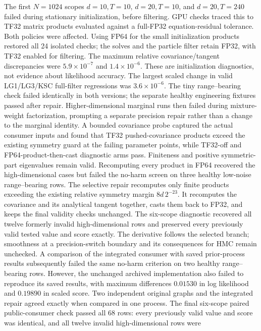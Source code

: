 \documentclass[11pt]{article}
\begin{document}
The first $N=1024$ scopes $d=10,T=10$, $d=20,T=10$, and
$d=20,T=240$ failed during stationary initialization, before filtering.
GPU checks traced this to TF32 matrix products evaluated against a
full-FP32 equation-residual tolerance. Both policies were affected.
Using FP64 for the small initialization products restored all 24 isolated
checks; the solves and the particle filter retain FP32, with TF32 enabled
for filtering. The maximum relative covariance/tangent discrepancies were
$5.9\times10^{-7}$ and $1.4\times10^{-6}$. These are initialization diagnostics,
not evidence about likelihood accuracy. The largest scaled change in valid
LG1/LG3/KSC full-filter regressions was $3.6\times10^{-6}$. The tiny
range--bearing check failed identically in both versions; the separate healthy
engineering fixtures passed after repair. Higher-dimensional marginal runs
then failed during mixture-weight factorization, prompting a separate
precision repair rather than a change to the marginal identity. A bounded covariance probe captured the actual
consumer inputs and found that TF32 pushed-covariance products exceed the
existing symmetry guard at the failing parameter points, while TF32-off and
FP64-product-then-cast diagnostic arms pass. Finiteness and positive
symmetric-part eigenvalues remain valid. Recomputing every product in FP64
recovered the high-dimensional cases but failed the no-harm screen on three
healthy low-noise range--bearing rows. The selective repair recomputes only
finite products exceeding the existing relative symmetry margin
$8d\,2^{-23}$. It recomputes the covariance and its analytical tangent
together, casts them back to FP32, and keeps the final validity checks
unchanged. The six-scope diagnostic recovered all twelve formerly invalid
high-dimensional rows and preserved every previously valid tested value and
score exactly. The derivative follows the selected branch; smoothness at a
precision-switch boundary and its consequences for HMC remain unchecked.
A comparison of the integrated consumer with saved prior-process results
subsequently failed the same no-harm criterion on two healthy range--bearing
rows. However, the unchanged archived implementation also failed to reproduce
its saved results, with maximum differences $0.01530$ in log likelihood and
$0.19890$ in scaled score. Two independent original graphs and the integrated
repair agreed exactly when compared in one process. The final six-scope
paired public-consumer check passed all 68 rows: every previously valid value
and score was identical, and all twelve invalid high-dimensional rows were
\end{document}
